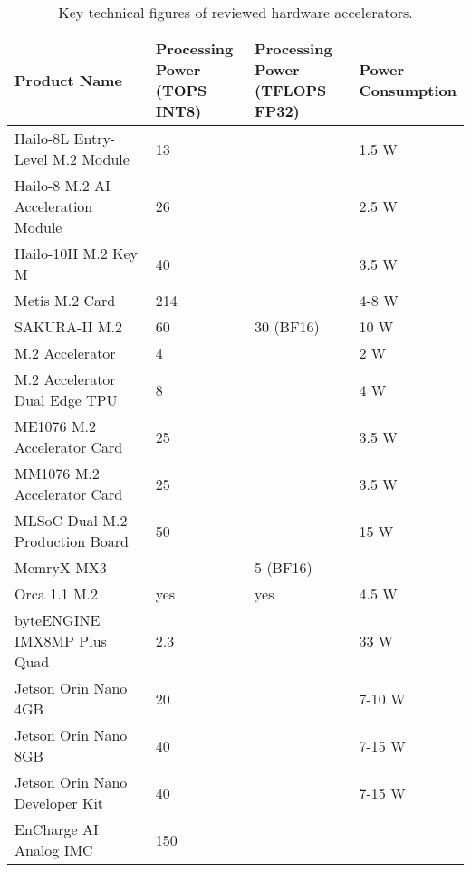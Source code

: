 \begin{table}[!ht]
    \centering
    \begin{tabular}{|l|l|l|l|}
    \hline
        Product Name & \makecell{Processing\\Power\\(TOPS INT8)} & \makecell{Processing\\Power\\(TFLOPS FP32)} & \makecell{Power\\Consumption} \\ \hline
        Hailo-8L Entry-Level M.2 Module & 13 & ~ & 1.5 W \\ \hline
        Hailo-8 M.2 AI Acceleration Module & 26 & ~ & 2.5 W \\ \hline
        Hailo-10H M.2 Key M & 40 & ~ & 3.5 W \\ \hline
        Metis M.2 Card & 214 & ~ & 4-8 W \\ \hline
        SAKURA-II M.2 & 60 & 30 (BF16) & 10 W \\ \hline
        M.2 Accelerator & 4 & ~ & 2 W \\ \hline
        M.2 Accelerator Dual Edge TPU & 8 & ~ & 4 W \\ \hline
        ME1076 M.2 Accelerator Card & 25 & ~ & 3.5 W \\ \hline
        MM1076 M.2 Accelerator Card & 25 & ~ & 3.5 W \\ \hline
        MLSoC Dual M.2 Production Board & 50 & ~ & 15 W \\ \hline
        MemryX MX3 & ~ & 5 (BF16) & ~ \\ \hline
        Orca 1.1 M.2 & yes & yes & 4.5 W \\ \hline
        byteENGINE IMX8MP Plus Quad & 2.3 & ~ & 33 W \\ \hline
        Jetson Orin Nano 4GB & 20 & ~ & 7-10 W \\ \hline
        Jetson Orin Nano 8GB & 40 & ~ & 7-15 W \\ \hline
        Jetson Orin Nano Developer Kit & 40 & ~ & 7-15 W \\ \hline
        EnCharge AI Analog IMC & 150  & ~ & ~ \\ \hline
    \end{tabular}
    \caption{Key technical figures of reviewed hardware accelerators.}
    \label{tab:market:keyfigures}
\end{table}
